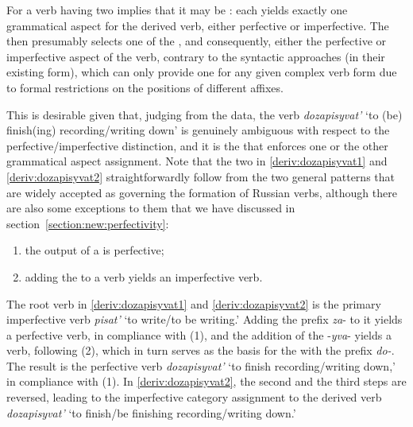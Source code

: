 For a verb having two  implies that it may be : each  yields exactly one grammatical aspect for the derived verb, either perfective or imperfective. The  then presumably selects one of the , and consequently, either the perfective or imperfective aspect of the verb, contrary to the syntactic approaches (in their existing form), which can only provide one  for any given complex verb form due to formal restrictions on the positions of different affixes.

This is desirable given that, judging from the data, the verb \textit{dozapisyvat'} `to (be) finish(ing) recording/writing down' is genuinely ambiguous with respect to the perfective/imperfective distinction, and it is the  that enforces one or the other grammatical aspect assignment. Note that the two  in \ref{deriv:dozapisyvat1} and \ref{deriv:dozapisyvat2} straightforwardly follow from the two general patterns that are widely accepted as governing the formation of Russian verbs, although there are also some exceptions to them that we have discussed in section~\ref{section:new:perfectivity}:

\begin{enumerate}
\item the output of a  is perfective;   
\item adding the  to a verb yields an imperfective verb. 
\end{enumerate}

The root verb in \ref{deriv:dozapisyvat1} and \ref{deriv:dozapisyvat2} is the primary imperfective verb \textit{pisat'} `to write/to be writing.' Adding the prefix \textit{za}- to it yields a perfective verb, in compliance with (1), and the addition of the  -\textit{yva}- yields a  verb, following (2), which in turn serves as the basis for the  with the  prefix \textit{do-}. The result is the perfective verb \textit{dozapisyvat'} `to finish recording/writing down,' in compliance with (1).  In \ref{deriv:dozapisyvat2}, the second and the third steps are reversed, leading to the imperfective category assignment to the derived verb \textit{dozapisyvat'} `to finish/be finishing recording/writing down.'

